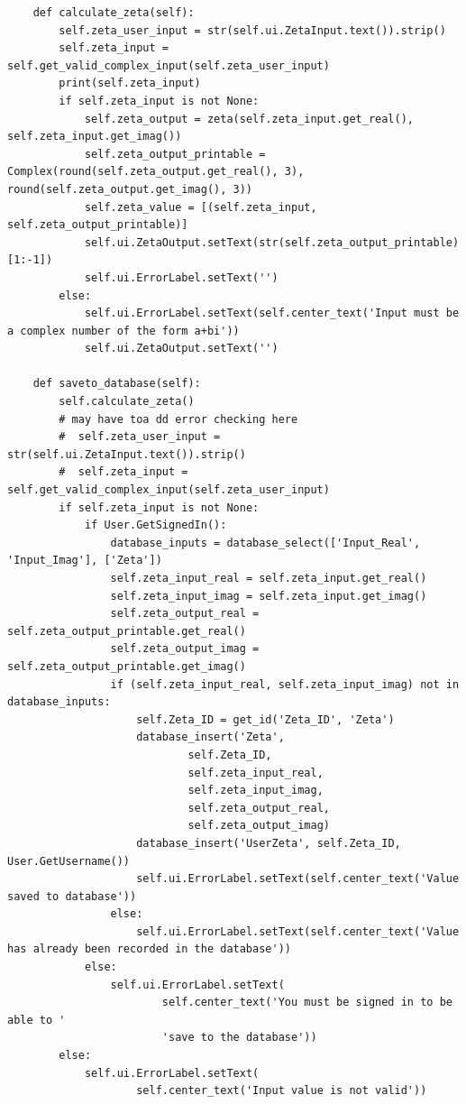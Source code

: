 \documentclass{article}
\begin{document}
\begin{lstlisting}
    def calculate_zeta(self):
        self.zeta_user_input = str(self.ui.ZetaInput.text()).strip()
        self.zeta_input = self.get_valid_complex_input(self.zeta_user_input)
        print(self.zeta_input)
        if self.zeta_input is not None:
            self.zeta_output = zeta(self.zeta_input.get_real(), self.zeta_input.get_imag())
            self.zeta_output_printable = Complex(round(self.zeta_output.get_real(), 3), round(self.zeta_output.get_imag(), 3))
            self.zeta_value = [(self.zeta_input, self.zeta_output_printable)]
            self.ui.ZetaOutput.setText(str(self.zeta_output_printable)[1:-1])
            self.ui.ErrorLabel.setText('')
        else:
            self.ui.ErrorLabel.setText(self.center_text('Input must be a complex number of the form a+bi'))
            self.ui.ZetaOutput.setText('')

    def saveto_database(self):
        self.calculate_zeta()
        # may have toa dd error checking here
        #  self.zeta_user_input = str(self.ui.ZetaInput.text()).strip()
        #  self.zeta_input = self.get_valid_complex_input(self.zeta_user_input)
        if self.zeta_input is not None:
            if User.GetSignedIn():
                database_inputs = database_select(['Input_Real', 'Input_Imag'], ['Zeta'])
                self.zeta_input_real = self.zeta_input.get_real()
                self.zeta_input_imag = self.zeta_input.get_imag()
                self.zeta_output_real = self.zeta_output_printable.get_real()
                self.zeta_output_imag = self.zeta_output_printable.get_imag()
                if (self.zeta_input_real, self.zeta_input_imag) not in database_inputs:
                    self.Zeta_ID = get_id('Zeta_ID', 'Zeta')
                    database_insert('Zeta',
                            self.Zeta_ID,
                            self.zeta_input_real,
                            self.zeta_input_imag,
                            self.zeta_output_real,
                            self.zeta_output_imag)
                    database_insert('UserZeta', self.Zeta_ID, User.GetUsername())
                    self.ui.ErrorLabel.setText(self.center_text('Value saved to database'))
                else:
                    self.ui.ErrorLabel.setText(self.center_text('Value has already been recorded in the database'))
            else:
                self.ui.ErrorLabel.setText(
                        self.center_text('You must be signed in to be able to '
                        'save to the database'))
        else:
            self.ui.ErrorLabel.setText(
                    self.center_text('Input value is not valid'))


\end{lstlisting}
\end{document}
